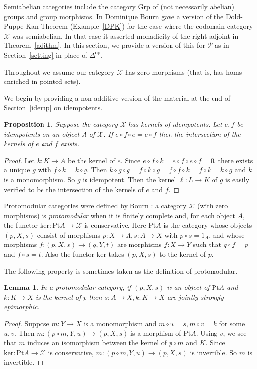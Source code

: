 \documentclass[a4paper,12pt,reqno]{amsart}
\newtheorem{lemma}[theorem]{Lemma}
\newtheorem{proposition}[theorem]{Proposition}
\theoremstyle{definition}
\theoremstyle{fact}
\theoremstyle{genquest}
\theoremstyle{step}
\newcommand{\ra}{\rightarrow}
\def\CP{{\mathscr P}}
\def\CX{{\mathscr X}}
\begin{document}
Semiabelian categories include the category $\mathrm{Grp}$ of 
(not necessarily abelian) groups and group morphisms.
In \cite{Bourn07} Dominique Bourn gave a version of the Dold-Puppe-Kan Theorem (Example~\ref{DPK})
for the case where the codomain category $\CX$ was semiabelian.
In that case it asserted monadicity of the right adjoint in Theorem~\ref{adjthm}. 
In this section, we provide a version of this for $\CP$ as in Section~\ref{setting}
in place of $\Delta^{\mathrm{op}}$. 

Throughout we assume our category $\CX$ has zero morphisms (that is, has homs enriched in pointed sets).

We begin by providing a non-additive version of the material at the end of Section~\ref{idemp} on idempotents. 

\begin{proposition}
Suppose the category $\CX$ has kernels of idempotents.
Let $e,f$ be idempotents on an object $A$ of $\CX$.
If $e\circ f\circ e = e\circ f$ then the intersection of the kernels of $e$ and $f$ exists.
\end{proposition}
\begin{proof}
Let $k:K\ra A$ be the kernel of $e$.
Since $e\circ f \circ k=e\circ f\circ e\circ f =0$, there exists a unique $g$ with 
$f\circ k=k\circ g$. Then $k\circ g\circ g = f\circ k\circ g=f\circ f \circ k=f\circ k=k\circ g$ and $k$ is a monomorphism. So $g$ is idempotent. Then the kernel $\ell :L\ra K$ of $g$ is easily verified to be the intersection of the kernels of $e$ and $f$.
\end{proof}

Protomodular categories were defined by Bourn \cite{Bourn91}:
a category $\CX$ (with zero morphisms) is {\em protomodular} when 
it is finitely complete and, for each object $A$, 
the functor $\mathrm{ker}: \mathrm{Pt}A\ra \CX$ is conservative. 
Here $\mathrm{Pt}A$ is the category
whose objects $(p,X,s)$ consist of morphisms $p:X\ra A, s:A\ra X$ with
$p\circ s = 1_A$, and whose morphisms $f:(p,X,s)\ra (q,Y,t)$ are morphisms
$f:X\ra Y$ such that $q\circ f = p$ and $f\circ s = t$.
Also the functor $\mathrm{ker}$ takes $(p,X,s)$ to the kernel of $p$.

The following property is sometimes \cite{BorBou07} taken as the definition of protomodular.  

\begin{lemma}\label{protolemma} 
In a protomodular category, if $(p,X,s)$ is an object of 
$\mathrm{Pt}A$ and $k:K\ra X$
is the kernel of $p$ then $s:A\ra X, k:K\ra X$ are jointly strongly epimorphic.
\end{lemma}
\begin{proof} Suppose $m:Y\ra X$ is a monomorphism and $m\circ u = s, m\circ v = k$ for some $u,v$. Then $m:(p\circ m,Y,u)\ra (p,X,s)$ is a morphism of
$\mathrm{Pt}A$. Using $v$, we see that $m$ induces an isomorphism between
the kernel of $p\circ m$ and $K$. Since $\mathrm{ker}: \mathrm{Pt}A\ra \CX$
is conservative, $m:(p\circ m,Y,u)\ra (p,X,s)$ is invertible. So $m$ is invertible.   
\end{proof}      
\end{document}

